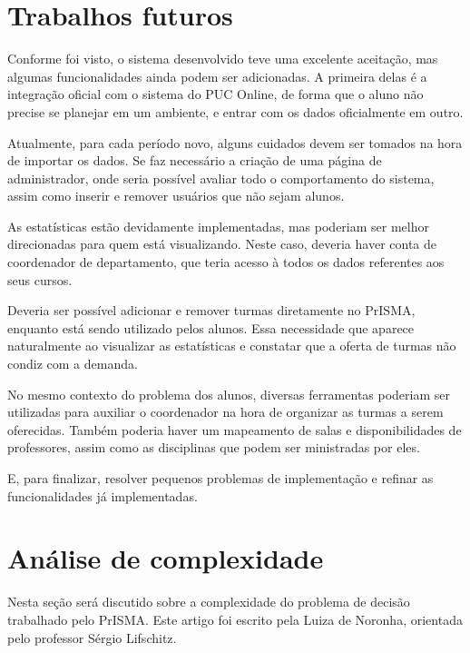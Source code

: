 \documentclass[graduacao,brazil]{ThesisPUC}
\begin{document}
\chapter{Trabalhos futuros}

Conforme foi visto, o sistema desenvolvido teve uma excelente aceitação, mas algumas funcionalidades ainda podem ser adicionadas. A primeira delas é a integração oficial com o sistema do PUC Online, de forma que o aluno não precise se planejar em um ambiente, e entrar com os dados oficialmente em outro.

Atualmente, para cada período novo, alguns cuidados devem ser tomados na hora de importar os dados. Se faz necessário a criação de uma página de administrador, onde seria possível avaliar todo o comportamento do sistema, assim como inserir e remover usuários que não sejam alunos.

As estatísticas estão devidamente implementadas, mas poderiam ser melhor direcionadas para quem está visualizando. Neste caso, deveria haver conta de coordenador de departamento, que teria acesso à todos os dados referentes aos seus cursos.

Deveria ser possível adicionar e remover turmas diretamente no PrISMA, enquanto está sendo utilizado pelos alunos. Essa necessidade que aparece naturalmente ao visualizar as estatísticas e constatar que a oferta de turmas não condiz com a demanda.

No mesmo contexto do problema dos alunos, diversas ferramentas poderiam ser utilizadas para auxiliar o coordenador na hora de organizar as turmas a serem oferecidas. Também poderia haver um mapeamento de salas e disponibilidades de professores, assim como as disciplinas que podem ser ministradas por eles.

E, para finalizar, resolver pequenos problemas de implementação e refinar as funcionalidades já implementadas.

\arial
\nocite{*}


\normalfont

\appendix
\chapter{Análise de complexidade}

Nesta seção será discutido sobre a complexidade do problema de decisão trabalhado pelo PrISMA. Este artigo foi escrito pela Luiza de Noronha, orientada pelo professor Sérgio Lifschitz.
\end{document}
